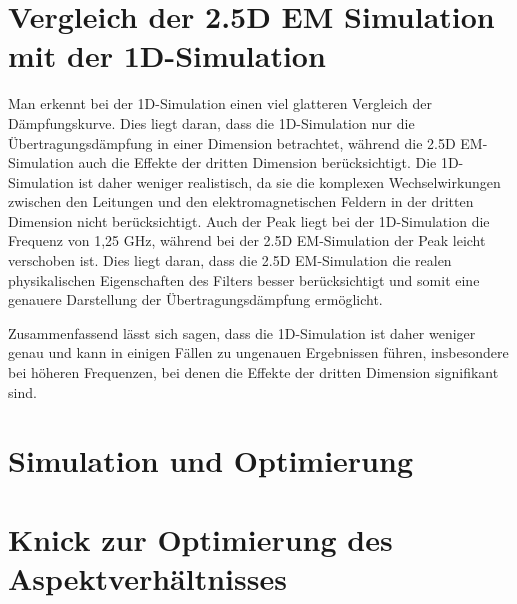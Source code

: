 \section{Vergleich der 2.5D EM Simulation mit der 1D-Simulation}
Man erkennt bei der 1D-Simulation einen viel glatteren Vergleich der Dämpfungskurve. Dies liegt daran, dass die 1D-Simulation nur die Übertragungsdämpfung in einer Dimension betrachtet, während die 2.5D EM-Simulation auch die Effekte der dritten Dimension berücksichtigt.
Die 1D-Simulation ist daher weniger realistisch, da sie die komplexen Wechselwirkungen zwischen den Leitungen und den elektromagnetischen Feldern in der dritten Dimension nicht berücksichtigt.
Auch der Peak liegt bei der 1D-Simulation die Frequenz von 1,25 GHz, während bei der 2.5D EM-Simulation der Peak leicht verschoben ist. Dies liegt daran, dass die 2.5D EM-Simulation die realen physikalischen Eigenschaften des Filters besser berücksichtigt und somit eine genauere Darstellung der Übertragungsdämpfung ermöglicht.

Zusammenfassend lässt sich sagen, dass die 1D-Simulation ist daher weniger genau und kann in einigen Fällen zu ungenauen Ergebnissen führen, insbesondere bei höheren Frequenzen, bei denen die Effekte der dritten Dimension signifikant sind.

\section{Simulation und Optimierung}
    

\section{Knick zur Optimierung des Aspektverhältnisses}

